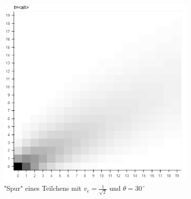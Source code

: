 \documentclass[a4paper,12pt,ngerman]{scrartcl}
\theoremstyle{plain}
\theoremstyle{plain}
\theoremstyle{plain}
\theoremstyle{plain}
\begin{document}
\begin{figure}[h]
\centering
\includegraphics[width=10cm]{movement-trace-30-deg-1-speed.png}
\caption{"Spur" eines Teilchens mit $v_e=\frac{1}{\sqrt{2}}$ und $\theta=30^{\,\circ}$}
\end{figure}
\end{document}
